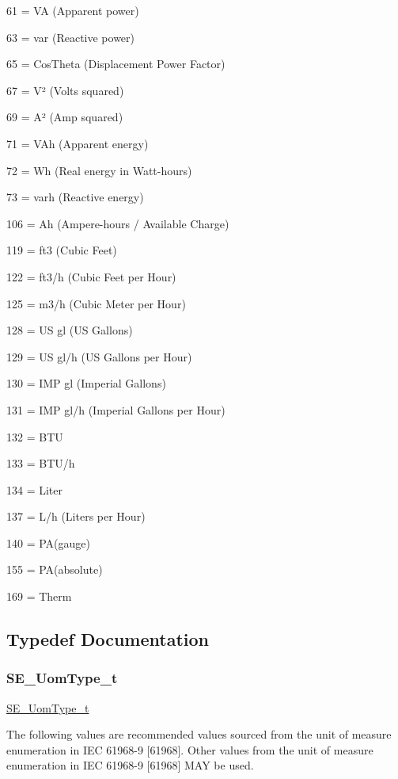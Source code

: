 61 = VA (Apparent power)

63 = var (Reactive power)

65 = Cos\+Theta (Displacement Power Factor)

67 = V² (Volts squared)

69 = A² (Amp squared)

71 = V\+Ah (Apparent energy)

72 = Wh (Real energy in Watt-\/hours)

73 = varh (Reactive energy)

106 = Ah (Ampere-\/hours / Available Charge)

119 = ft3 (Cubic Feet)

122 = ft3/h (Cubic Feet per Hour)

125 = m3/h (Cubic Meter per Hour)

128 = US gl (US Gallons)

129 = US gl/h (US Gallons per Hour)

130 = I\+MP gl (Imperial Gallons)

131 = I\+MP gl/h (Imperial Gallons per Hour)

132 = B\+TU

133 = B\+T\+U/h

134 = Liter

137 = L/h (Liters per Hour)

140 = P\+A(gauge)

155 = P\+A(absolute)

169 = Therm 

\subsection{Typedef Documentation}
\mbox{\label{group__UomType_ga35de8fcdea40d7edbdd341581cf651f1}} 
\subsubsection{\texorpdfstring{S\+E\+\_\+\+Uom\+Type\+\_\+t}{SE\_UomType\_t}}
{\footnotesize\ttfamily \hyperlink{group__UomType_ga35de8fcdea40d7edbdd341581cf651f1}{S\+E\+\_\+\+Uom\+Type\+\_\+t}}

The following values are recommended values sourced from the unit of measure enumeration in I\+EC 61968-\/9 \mbox{[}61968\mbox{]}. Other values from the unit of measure enumeration in I\+EC 61968-\/9 \mbox{[}61968\mbox{]} M\+AY be used.

